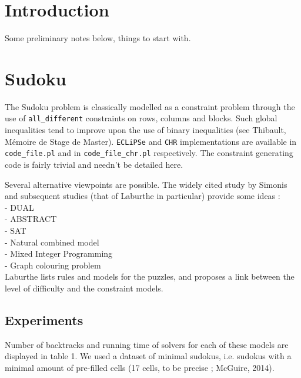 \documentclass{misc/theme}
\begin{document}
\maketitle

\tableofcontents\newpage

\section{Introduction}

Some preliminary notes below, things to start with.

\section{Sudoku}

The Sudoku problem is classically modelled as a constraint problem through the use of \texttt{all\_different} constraints on rows, columns and blocks. Such global inequalities tend to improve upon the use of binary inequalities (see Thibault, M\'emoire de Stage de Master). \texttt{ECLiPSe} and \texttt{CHR} implementations are available in \texttt{code\_file.pl} and in \texttt{code\_file\_chr.pl} respectively. The constraint generating code is fairly trivial and needn't be detailed here. \\\par

Several alternative viewpoints are possible. The widely cited study by Simonis and subsequent studies (that of Laburthe in particular) provide some ideas :\\
 - DUAL\\
 - ABSTRACT\\
 - SAT\\
 - Natural combined model\\
 - Mixed Integer Programming\\
 - Graph colouring problem\\
Laburthe lists rules and models for the puzzles, and proposes a link between the level of difficulty and the constraint models. \\\par

\subsection{Experiments}

Number of backtracks and running time of solvers for each of these models are displayed in table 1. We used a dataset of minimal sudokus, i.e. sudokus with a minimal amount of pre-filled cells (17 cells, to be precise ; McGuire, 2014). \\\par
\end{document}
